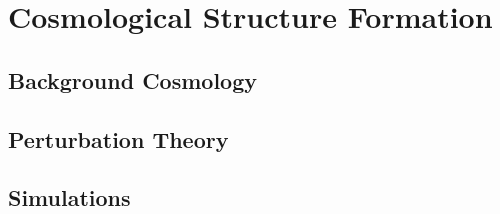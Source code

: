 %
%

\part{Cosmological Structure Formation}\label{part:cosmological_structure_formation}

\chapter{Background Cosmology}\label{ch:cosmological_structure_formation:background}


\chapter{Perturbation Theory}\label{ch:cosmological_structure_formation:perturbation_theory}


\chapter{Simulations}\label{ch:cosmological_structure_formation:simulations}

